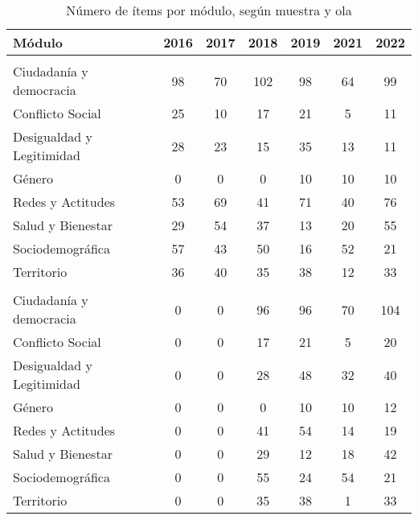 \documentclass[
  12pt,
]{article}
\begin{document}
\begin{table}[H]

\caption{\label{tab:tabla-items-olas-modulos}Número de ítems por  módulo, según muestra y ola}
\centering
\begin{tabular}[t]{lcccccc}
\toprule
Módulo & 2016 & 2017 & 2018 & 2019 & 2021 & 2022\\
\midrule
\addlinespace[0.3em]
\multicolumn{7}{l}{\textbf{Muestra Original}}\\
\hspace{1em}Ciudadanía y democracia & 98 & 70 & 102 & 98 & 64 & 99\\
\hspace{1em}Conflicto Social & 25 & 10 & 17 & 21 & 5 & 11\\
\hspace{1em}Desigualdad y Legitimidad & 28 & 23 & 15 & 35 & 13 & 11\\
\hspace{1em}Género & 0 & 0 & 0 & 10 & 10 & 10\\
\hspace{1em}Redes y Actitudes & 53 & 69 & 41 & 71 & 40 & 76\\
\hspace{1em}Salud y Bienestar & 29 & 54 & 37 & 13 & 20 & 55\\
\hspace{1em}Sociodemográfica & 57 & 43 & 50 & 16 & 52 & 21\\
\hspace{1em}Territorio & 36 & 40 & 35 & 38 & 12 & 33\\
\addlinespace[0.3em]
\multicolumn{7}{l}{\textbf{Muestra Refresco}}\\
\hspace{1em}Ciudadanía y democracia & 0 & 0 & 96 & 96 & 70 & 104\\
\hspace{1em}Conflicto Social & 0 & 0 & 17 & 21 & 5 & 20\\
\hspace{1em}Desigualdad y Legitimidad & 0 & 0 & 28 & 48 & 32 & 40\\
\hspace{1em}Género & 0 & 0 & 0 & 10 & 10 & 12\\
\hspace{1em}Redes y Actitudes & 0 & 0 & 41 & 54 & 14 & 19\\
\hspace{1em}Salud y Bienestar & 0 & 0 & 29 & 12 & 18 & 42\\
\hspace{1em}Sociodemográfica & 0 & 0 & 55 & 24 & 54 & 21\\
\hspace{1em}Territorio & 0 & 0 & 35 & 38 & 1 & 33\\
\bottomrule
\end{tabular}
\end{table}
\end{document}
